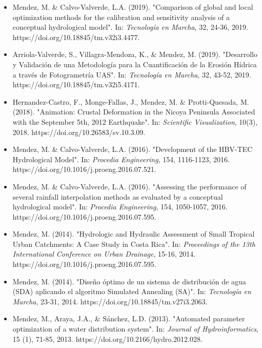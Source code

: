 \documentclass[10pt,letterpaper,english]{article}
\begin{document}
\begin{paracol}{2}
\begin{rightcolumn}
\begin{itemize}[leftmargin=*]
\item Mendez, M. \& Calvo-Valverde, L.A. (2019). "Comparison of global and local optimization methods for the calibration and sensitivity analysis of a conceptual hydrological model". In: \textit{Tecnología en Marcha}, 32, 24-36, 2019. \newline https://doi.org/10.18845/tm.v32i3.4477.
\item Arriola-Valverde, S., Villagra-Mendoza, K., \& Mendez, M. (2019). "Desarrollo y Validación de una Metodología para la Cuantificación de la Erosión Hídrica a través de Fotogrametría UAS". In: \textit{Tecnología en Marcha}, 32, 43-52, 2019. \newline https://doi.org/10.18845/tm.v32i5.4171.
\item Hernandez-Castro, F., Monge-Fallas, J., Mendez, M. \& Protti-Quesada, M. (2018). "Animation: Crustal Deformation in the Nicoya Peninsula Associated with the September 5th, 2012 Earthquake". In: \textit{Scientific Visualization}, 10(3), 2018. \newline https://doi.org/10.26583/sv.10.3.09.
\item Mendez, M. \& Calvo-Valverde, L.A. (2016). "Development of the HBV-TEC Hydrological Model". In: \textit{Procedia Engineering}, 154, 1116-1123, 2016. \newline https://doi.org/10.1016/j.proeng.2016.07.521.
\item Mendez, M. \& Calvo-Valverde, L.A. (2016). "Assessing the performance of several rainfall interpolation methods as evaluated by a conceptual hydrological model". In: \textit{Procedia Engineering}, 154, 1050-1057, 2016. \newline https://doi.org/10.1016/j.proeng.2016.07.595.
\item Mendez, M. (2014). "Hydrologic and Hydraulic Assessment of Small Tropical Urban Catchments: A Case Study in Costa Rica". In: \textit{Proceedings of the 13th International Conference on Urban Drainage}, 15-16, 2014. \newline https://doi.org/10.1016/j.proeng.2016.07.595.
\item Mendez, M. (2014). "Diseño óptimo de un sistema de distribución de agua (SDA) aplicando el algoritmo Simulated Annealing (SA)". In: \textit{Tecnología en Marcha}, 23-31, 2014. \newline https://doi.org/10.18845/tm.v27i3.2063.
\item Mendez, M., Araya, J.A., \& Sánchez, L.D. (2013). "Automated parameter optimization of a water distribution system". In: \textit{Journal of Hydroinformatics}, 15 (1), 71-85, 2013. \newline https://doi.org/10.2166/hydro.2012.028.

\end{itemize}
\end{rightcolumn}
\end{paracol}
\end{document}
